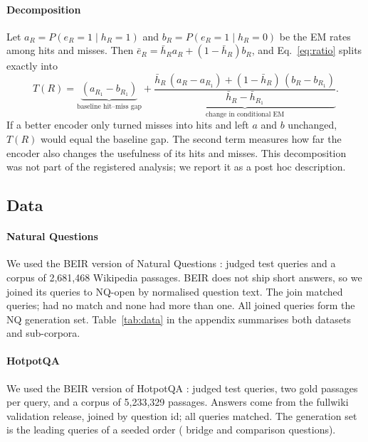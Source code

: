 \paragraph{Decomposition}
Let $a_R=P(e_R=1\mid h_R=1)$ and $b_R=P(e_R=1\mid h_R=0)$ be the EM rates among hits and misses. Then $\bar e_R=\bar h_R a_R+(1-\bar h_R)b_R$, and Eq.~\ref{eq:ratio} splits exactly into
\begin{equation}
T(R) = \underbrace{(a_{R_1}-b_{R_1})}_{\text{baseline hit--miss gap}} + \underbrace{\frac{\bar h_R\,(a_R-a_{R_1}) + (1-\bar h_R)\,(b_R-b_{R_1})}{\bar h_R-\bar h_{R_1}}}_{\text{change in conditional EM}}.
\label{eq:decomp}
\end{equation}
If a better encoder only turned misses into hits and left $a$ and $b$ unchanged, $T(R)$ would equal the baseline gap. The second term measures how far the encoder also changes the usefulness of its hits and misses. This decomposition was not part of the registered analysis; we report it as a post hoc description.

\subsection{Data}\label{sec:data}
\paragraph{Natural Questions}
We used the BEIR version of Natural Questions \citep{kwiatkowski2019nq,thakur2021beir}:  judged test queries and a corpus of 2,681,468 Wikipedia passages. BEIR does not ship short answers, so we joined its queries to NQ-open \citep{lee2019orqa} by normalised question text. The join matched  queries;  had no match and none had more than one. All  joined queries form the NQ generation set. Table~\ref{tab:data} in the appendix summarises both datasets and sub-corpora.

\paragraph{HotpotQA}
We used the BEIR version of HotpotQA \citep{yang2018hotpotqa,thakur2021beir}:  judged test queries, two gold passages per query, and a corpus of 5,233,329 passages. Answers come from the fullwiki validation release, joined by question id; all queries matched. The generation set is the leading  queries of a seeded order ( bridge and  comparison questions).

